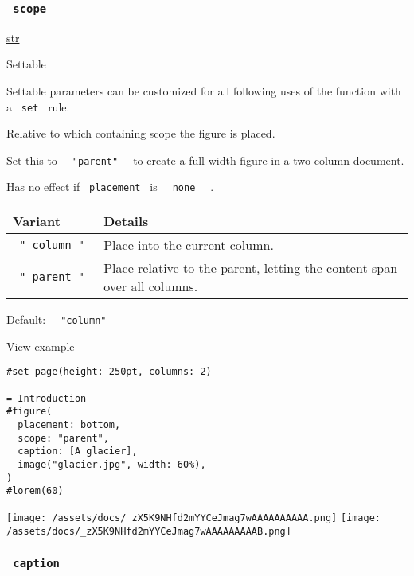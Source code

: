\subsubsection{\texorpdfstring{\texttt{\ scope\ }}{ scope }}\label{parameters-scope}

\href{/docs/reference/foundations/str/}{str}

{{ Settable }}

\label{parameters-scope-settable-tooltip}
Settable parameters can be customized for all following uses of the
function with a \texttt{\ set\ } rule.

Relative to which containing scope the figure is placed.

Set this to \texttt{\ }{\texttt{\ "parent"\ }}\texttt{\ } to create a
full-width figure in a two-column document.

Has no effect if \texttt{\ placement\ } is
\texttt{\ }{\texttt{\ none\ }}\texttt{\ } .

\begin{longtable}[]{@{}ll@{}}
\toprule\noalign{}
Variant & Details \\
\midrule\noalign{}
\endhead
\bottomrule\noalign{}
\endlastfoot
\texttt{\ "\ column\ "\ } & Place into the current column. \\
\texttt{\ "\ parent\ "\ } & Place relative to the parent, letting the
content span over all columns. \\
\end{longtable}

Default: \texttt{\ }{\texttt{\ "column"\ }}\texttt{\ }


View example

\begin{verbatim}
#set page(height: 250pt, columns: 2)

= Introduction
#figure(
  placement: bottom,
  scope: "parent",
  caption: [A glacier],
  image("glacier.jpg", width: 60%),
)
#lorem(60)
\end{verbatim}

\texttt{[image: /assets/docs/\_zX5K9NHfd2mYYCeJmag7wAAAAAAAAAA.png]}
\texttt{[image: /assets/docs/\_zX5K9NHfd2mYYCeJmag7wAAAAAAAAAB.png]}

\subsubsection{\texorpdfstring{\texttt{\ caption\ }}{ caption }}\label{parameters-caption}

